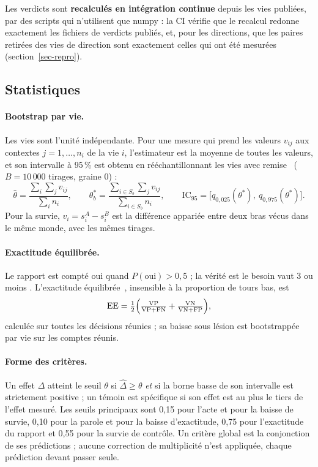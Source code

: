 \documentclass[11pt,a4paper]{article}
\begin{document}
Les verdicts sont \textbf{recalculés en intégration continue} depuis les vies
publiées, par des scripts qui n'utilisent que numpy : la CI vérifie que le
recalcul redonne exactement les fichiers de verdicts publiés, et, pour les
directions, que les paires retirées des vies de direction sont exactement celles
qui ont été mesurées (section~\ref{sec-repro}).

\subsection{Statistiques}
\label{sec-stats}

\paragraph{Bootstrap par vie.} Les vies sont l'unité indépendante. Pour une mesure
qui prend les valeurs $v_{ij}$ aux contextes $j=1,\dots,n_i$ de la vie $i$, l'estimateur
est la moyenne de toutes les valeurs, et son intervalle à 95\,\% est obtenu en
rééchantillonnant les vies avec remise~\cite{efron1993} ($B=10\,000$ tirages, graine 0) :
\begin{equation}
\hat\theta=\frac{\sum_i\sum_j v_{ij}}{\sum_i n_i},\qquad
\theta^\ast_b=\frac{\sum_{i\in S_b}\sum_j v_{ij}}{\sum_{i\in S_b} n_i},\qquad
\text{IC}_{95}=\bigl[q_{0,025}(\theta^\ast),\ q_{0,975}(\theta^\ast)\bigr].
\label{eq-boot}
\end{equation}
Pour la survie, $v_i=s_i^{A}-s_i^{B}$ est la différence appariée entre deux bras
vécus dans le même monde, avec les mêmes tirages.

\paragraph{Exactitude équilibrée.} Le rapport est compté \og oui \fg{} quand
$P(\text{oui})>0,5$ ; la vérité est \og le besoin vaut 3 ou moins \fg{}.
L'exactitude équilibrée~\cite{brodersen2010}, insensible à la proportion de tours bas, est
\begin{equation}
\mathrm{EE}=\tfrac12\Bigl(\tfrac{\mathrm{VP}}{\mathrm{VP}+\mathrm{FN}}+\tfrac{\mathrm{VN}}{\mathrm{VN}+\mathrm{FP}}\Bigr),
\label{eq-ba}
\end{equation}
calculée sur toutes les décisions réunies ; sa baisse sous lésion est
bootstrappée par vie sur les comptes réunis.

\paragraph{Forme des critères.} Un effet $\Delta$ \og atteint le seuil $\theta$ \fg{}
si $\hat\Delta\ge\theta$ \emph{et} si la borne basse de son intervalle est
strictement positive ; un témoin est \og spécifique \fg{} si son effet est au plus
le tiers de l'effet mesuré. Les seuils principaux sont 0,15 pour l'acte et pour la
baisse de survie, 0,10 pour la parole et pour la baisse d'exactitude, 0,75 pour
l'exactitude du rapport et 0,55 pour la survie de contrôle. Un critère global est
la conjonction de ses prédictions ; aucune correction de multiplicité n'est
appliquée, chaque prédiction devant passer seule.
\end{document}
